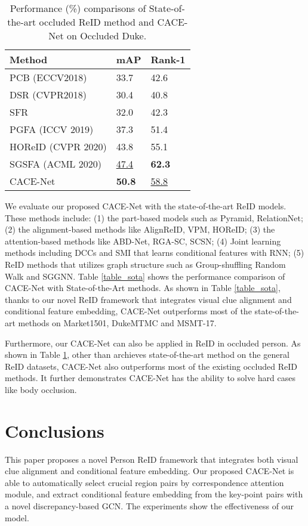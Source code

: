 \documentclass[final]{cvpr}
\begin{document}
\begin{table}[t]
\centering
\footnotesize
\caption{Performance (\%) comparisons of State-of-the-art occluded ReID method and CACE-Net on Occluded Duke.} 
\label{table_perf_occluded}
\begin{tabular}{lll}
\hline
Method &mAP&Rank-1\\
\hline
PCB (ECCV2018)\cite{sun2018beyond} & 33.7 & 42.6 \\ DSR (CVPR2018)\cite{he2018deep} & 30.4 & 40.8 \\ SFR \cite{he2018recognizing} & 32.0 & 42.3 \\ PGFA (ICCV 2019)\cite{miao2019pose} & 37.3 & 51.4 \\ HOReID (CVPR 2020) \cite{wang2020high} & 43.8 & 55.1 \\ SGSFA (ACML 2020) \cite{ren2020semantic} & \underline{47.4} & \textbf{62.3} \\ CACE-Net &  \textbf{50.8} & \underline{58.8} \\ \hline

\end{tabular}
\end{table}

We evaluate our proposed CACE-Net with the state-of-the-art ReID models. These methods include: (1) the part-based models such as Pyramid, RelationNet; (2) the alignment-based methods like AlignReID, VPM, HOReID;
(3) the attention-based methods like ABD-Net, RGA-SC, SCSN; (4) Joint learning methods including DCCs and SMI that learns conditional features with RNN; (5) ReID methods that utilizes graph structure such as Group-shuffling Random Walk and SGGNN. Table \ref{table_sota} shows the performance comparison of CACE-Net with State-of-the-Art methods. As shown in Table \ref{table_sota}, thanks to our novel ReID framework that integrates visual clue alignment and conditional feature embedding, CACE-Net outperforms most of the state-of-the-art methods on Market1501, DukeMTMC and MSMT-17. 

Furthermore, our CACE-Net can also be applied in ReID in occluded person. As shown in Table \ref{table_perf_occluded}, other than archieves state-of-the-art method on the general ReID datasets, CACE-Net also outperforms most of the existing occluded ReID methods. It further demonstrates CACE-Net has the ability to solve hard cases like  body occlusion. 



\section{Conclusions}
This paper proposes a novel Person ReID framework that integrates both visual clue alignment and conditional feature embedding. Our proposed CACE-Net is able to automatically select crucial region pairs by correspondence attention module, and extract conditional feature embedding from the key-point pairs with a novel discrepancy-based GCN. The experiments show the effectiveness of our model. 




\end{document}
